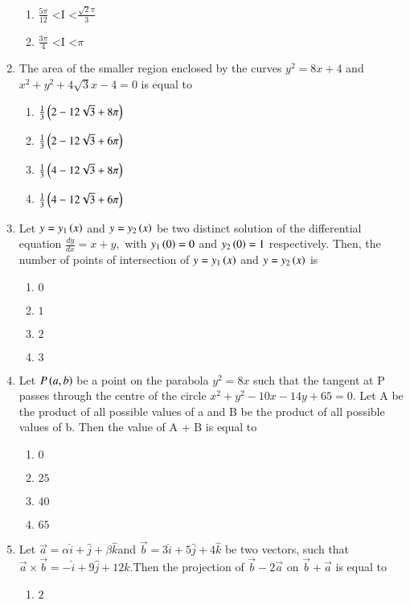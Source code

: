 \documentclass[journal,12pt,twocolumn]{IEEEtran}
\theoremstyle{remark}
\begin{document}
\begin{enumerate}[start=1]
\begin{enumerate}
    \item $ \frac{5\pi}{12}$ \textless I \textless $\frac{\sqrt{2}\pi}{3}$
    \item $ \frac{3\pi}{4}$ \textless I \textless $\pi$
\end{enumerate}
\item The area of the smaller region enclosed by the curves $y^2=8x+4$ and $x^2 +y^2 + 4\sqrt{3}x-4 =0$ is equal to
\begin{enumerate}
    \item $ \frac{1}{3}\left(2-12\sqrt{3} + 8\pi\right)$
    \item $ \frac{1}{3}\left(2-12\sqrt{3} + 6\pi\right)$
    \item $ \frac{1}{3}\left(4-12\sqrt{3} + 8\pi\right)$
    \item $ \frac{1}{3}\left(4-12\sqrt{3} + 6\pi\right)$
\end{enumerate}
\item  Let $y=y_1\left(x\right)$ and $y=y_2\left(x\right)$ be two distinct solution of the differential equation $\frac{dy}{dx}=x+y,$ with $y_1\left(0\right)=0$ and $y_2\left(0\right)=1$  respectively. Then, the number of points of intersection of $y=y_1\left(x\right)$ and $y=y_2\left(x\right)$ is
\begin{enumerate}
    \item $0$
    \item $1$
    \item $2$
    \item $3$
\end{enumerate}
\item Let $P\left(a,b\right)$  be a point on the parabola $y^2=8x$ such that the tangent at P passes through the centre of the circle $x^2+y^2-10x-14y+65=0$. Let A be the product of all possible values of a and B be the product of all possible values of b. Then the value of A + B is equal to
\begin{enumerate}
    \item $0$
    \item $25$
    \item $40$
    \item $65$
\end{enumerate}
\item Let $\vec{a} = \alpha \hat{i} + \hat{j} + \beta \hat{k} $and $ \vec{b} = 3 \hat{i} + 5\hat{j} + 4 \hat{k} $ be two vectors, such that $\vec{a} \times \vec{b} = -\hat{i} + 9\hat{j} + 12 \hat{k}. $Then the projection of $ \vec{b}-2\vec{a} $ on $ \vec{b}+ \vec{a}$ is equal to
\begin{enumerate}
    \item $2$

\end{enumerate}
\end{enumerate}
\end{document}
